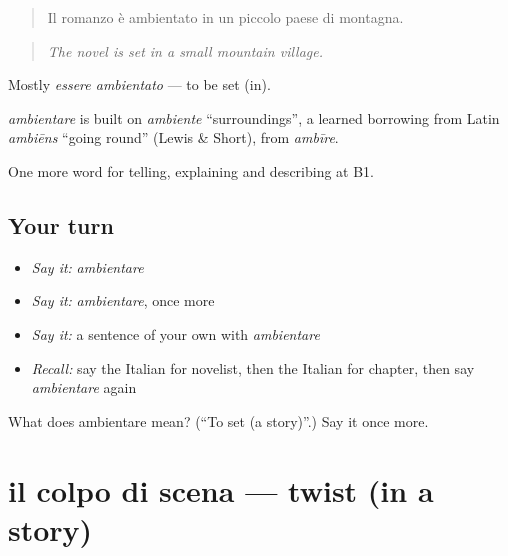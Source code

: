 \begin{quote}
Il romanzo è ambientato in un piccolo paese di montagna.
\end{quote}

\begin{quote}
\emph{The novel is set in a small mountain village.}
\end{quote}

Mostly \emph{essere ambientato} — to be set (in).

\begin{cousinweb}
\emph{ambientare} is built on \emph{ambiente} \textquotedblleft{}surroundings\textquotedblright{}, a learned borrowing from Latin \emph{ambiēns} \textquotedblleft{}going round\textquotedblright{} (Lewis \& Short), from \emph{ambīre}.
\end{cousinweb}

\begin{grammarlens}[title={What you've built}]
One more word for telling, explaining and describing at B1.
\end{grammarlens}

\subsection*{Your turn}
\begin{itemize}
\raggedright
  \item \emph{Say it:} \emph{ambientare}
  \item \emph{Say it:} \emph{ambientare}, once more
  \item \emph{Say it:} a sentence of your own with \emph{ambientare}
  \item \emph{Recall:} say the Italian for novelist, then the Italian for chapter, then say \emph{ambientare} again
\end{itemize}

\begin{tcolorbox}[breakable,colback=teal!4,colframe=teal!35!black,title={Before you move on}]
What does ambientare mean? (\textquotedblleft{}To set (a story)\textquotedblright{}.) Say it once more.
\end{tcolorbox}
\section[il colpo di scena]{il colpo di scena — twist (in a story)}

\label{lesson:IT-C524-colpo-di-scena}



